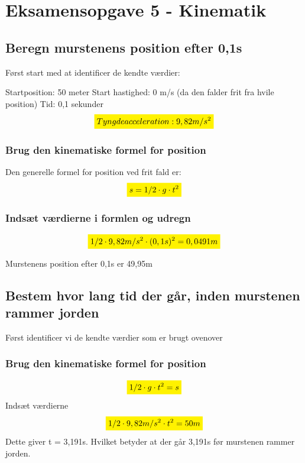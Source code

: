 \section{Eksamensopgave 5 - Kinematik}
\subsection{Beregn murstenens position efter 0,1s}
Først start med at identificer de kendte værdier:

Startposition: 50 meter 
\newline
Start hastighed: 0 m/s (da den falder frit fra hvile position)
\newline
Tid: 0,1 sekunder
\begin{equation*}
    \mathcolorbox{yellow}{Tyngdeacceleration: 9,82m/s^{2}}
\end{equation*}


\subsubsection{Brug den kinematiske formel for position}
Den generelle formel for position ved frit fald er:
\begin{equation*}
    \mathcolorbox{yellow}{s=1/2 \cdot g \cdot t^{2}}
\end{equation*}

\subsubsection{Indsæt værdierne i formlen og udregn}
\begin{equation*}
    \mathcolorbox{yellow}{1/2 \cdot 9,82m/s^{2} \cdot (0,1s)^{2}=0,0491m}
\end{equation*}

Murstenens position efter 0,1s er 49,95m

\subsection{Bestem hvor lang tid der går, inden murstenen rammer jorden}

Først identificer vi de kendte værdier som er brugt ovenover

\subsubsection{Brug den kinematiske formel for position}
\begin{equation*}
    \mathcolorbox{yellow}{1/2\cdot g\cdot t^{2}=s}
\end{equation*}
Indsæt værdierne
\begin{equation*}
    \mathcolorbox{yellow}{1/2\cdot9,82m/s^{2}\cdot t^{2}=50m}
\end{equation*}
Dette giver t = 3,191s. Hvilket betyder at der går 3,191s før murstenen rammer jorden.


